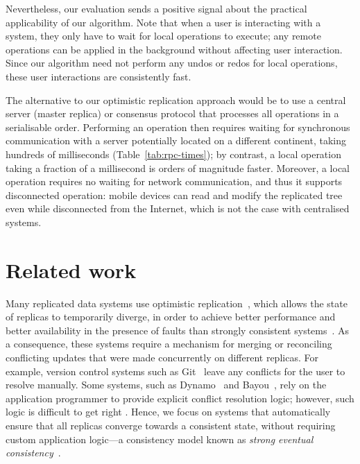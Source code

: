 \documentclass[sigplan,anonymous]{acmart}
\begin{document}
Nevertheless, our evaluation sends a positive signal about the practical applicability of our algorithm.
Note that when a user is interacting with a system, they only have to wait for local operations to execute; any remote operations can be applied in the background without affecting user interaction.
Since our algorithm need not perform any undos or redos for local operations, these user interactions are consistently fast.

The alternative to our optimistic replication approach would be to use a central server (master replica) or consensus protocol that processes all operations in a serialisable order.
Performing an operation then requires waiting for synchronous communication with a server potentially located on a different continent, taking hundreds of milliseconds (Table~\ref{tab:rpc-times}); by contrast, a local operation taking a fraction of a millisecond is orders of magnitude faster.
Moreover, a local operation requires no waiting for network communication, and thus it supports disconnected operation: mobile devices can read and modify the replicated tree even while disconnected from the Internet, which is not the case with centralised systems.

\section{Related work}\label{sec:relwork}

Many replicated data systems use optimistic replication~\cite{Saito:2005jw}, which allows the state of replicas to temporarily diverge, in order to achieve better performance and better availability in the presence of faults than strongly consistent systems~\cite{Bailis:2014th,Gilbert:2002il}.
As a consequence, these systems require a mechanism for merging or reconciling conflicting updates that were made concurrently on different replicas.
For example, version control systems such as Git~\cite{Chacon:2014kr} leave any conflicts for the user to resolve manually.
Some systems, such as Dynamo~\cite{DeCandia:2007ui} and Bayou~\cite{Terry:1995dn}, rely on the application programmer to provide explicit conflict resolution logic; however, such logic is difficult to get right \cite{Bailis:2013jc,Burckhardt:2014hy,Gomes:2017gy}.
Hence, we focus on systems that automatically ensure that all replicas converge towards a consistent state, without requiring custom application logic---a consistency model known as \emph{strong eventual consistency}~\cite{Shapiro:2011un,Gomes:2017gy}.
\end{document}
